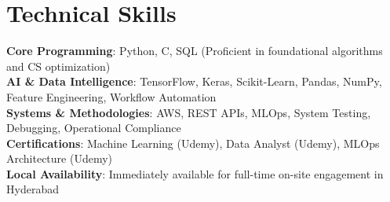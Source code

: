 \documentclass[letterpaper,11pt]{article}
\begin{document}
\section{Technical Skills}
  \vspace{-7pt}
  \begin{itemize}[leftmargin=0.15in, label={}]\small{\item{
    \textbf{Core Programming}{: Python, C, SQL (Proficient in foundational algorithms and CS optimization)} \\
    \textbf{AI \& Data Intelligence}{: TensorFlow, Keras, Scikit-Learn, Pandas, NumPy, Feature Engineering, Workflow Automation} \\
    \textbf{Systems \& Methodologies}{: AWS, REST APIs, MLOps, System Testing, Debugging, Operational Compliance} \\
    \textbf{Certifications}{: Machine Learning (Udemy), Data Analyst (Udemy), MLOps Architecture (Udemy)} \\
    \textbf{Local Availability}{: Immediately available for full-time on-site engagement in Hyderabad}
  }}
  \end{itemize}
\end{document}
